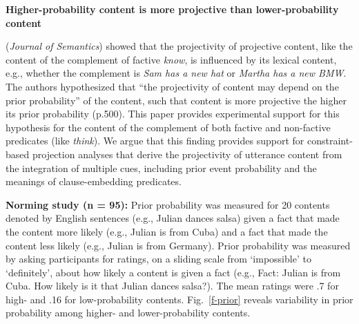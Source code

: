 \documentclass[12pt,fleqn]{article}
\newcommand{\6}{\mbox{$[\hspace*{-.6mm}[$}}
\newcommand{\9}{\mbox{$]\hspace*{-.6mm}]$}}
\begin{document}
  
\begin{center}
{\bf Higher-probability content is more projective than lower-probability content}
\end{center}

\vspace*{-.3cm}

\noindent
\citealt*{tbd-variability} ({\em Journal of Semantics}) showed that the projectivity of projective content, like the content of the complement of factive {\em know}, is influenced by its lexical content, e.g., whether the complement is {\em Sam has a new hat} or {\em Martha has a new BMW}. The authors hypothesized that ``the projectivity of content may depend on the prior probability'' of the content, such that content is more projective the higher its prior probability (p.500). This paper provides experimental support for this hypothesis for the content of the complement of both factive and non-factive predicates (like {\em think}). We argue that this finding provides support for constraint-based projection analyses that derive the projectivity of utterance content from the integration of multiple cues, including prior event probability and the meanings of clause-embedding predicates.


\noindent
{\bf Norming study (n = 95):} Prior probability was measured for 20 contents denoted by English sentences (e.g., Julian dances salsa) given a fact that made the content more likely (e.g., Julian is from Cuba) and a fact that made the content less likely (e.g., Julian is from Germany). Prior probability was measured by asking participants for ratings, on a sliding scale from `impossible' to `definitely', about how likely a content is given a fact (e.g., Fact: Julian is from Cuba. How likely is it that Julian dances salsa?). The mean ratings were .7 for high- and .16 for low-probability contents. Fig.~\ref{f-prior}  reveals variability in prior probability among higher- and lower-probability contents.
\end{document}
